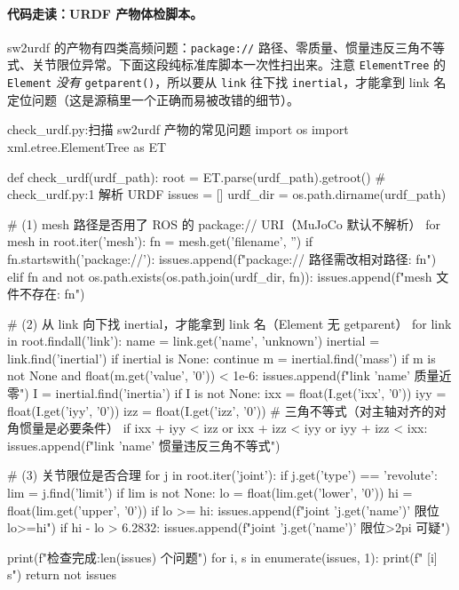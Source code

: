 \paragraph{代码走读：URDF 产物体检脚本。}sw2urdf 的产物有四类高频问题：\texttt{package://} 路径、零质量、惯量违反三角不等式、关节限位异常。下面这段纯标准库脚本一次性扫出来。注意 \texttt{ElementTree} 的 \texttt{Element} \emph{没有} \texttt{getparent()}，所以要从 \texttt{link} 往下找 \texttt{inertial}，才能拿到 link 名定位问题（这是源稿里一个正确而易被改错的细节）。

\begin{codebox}[Python]{check\_urdf.py:扫描 sw2urdf 产物的常见问题}
import os
import xml.etree.ElementTree as ET

def check_urdf(urdf_path):
    root = ET.parse(urdf_path).getroot()       # check_urdf.py:1 解析 URDF
    issues = []
    urdf_dir = os.path.dirname(urdf_path)

    # (1) mesh 路径是否用了 ROS 的 package:// URI（MuJoCo 默认不解析）
    for mesh in root.iter('mesh'):
        fn = mesh.get('filename', '')
        if fn.startswith('package://'):
            issues.append(f"package:// 路径需改相对路径: {fn}")
        elif fn and not os.path.exists(os.path.join(urdf_dir, fn)):
            issues.append(f"mesh 文件不存在: {fn}")

    # (2) 从 link 向下找 inertial，才能拿到 link 名（Element 无 getparent）
    for link in root.findall('link'):
        name = link.get('name', 'unknown')
        inertial = link.find('inertial')
        if inertial is None:
            continue
        m = inertial.find('mass')
        if m is not None and float(m.get('value', '0')) < 1e-6:
            issues.append(f"link '{name}' 质量近零")
        I = inertial.find('inertia')
        if I is not None:
            ixx = float(I.get('ixx', '0'))
            iyy = float(I.get('iyy', '0'))
            izz = float(I.get('izz', '0'))
            # 三角不等式（对主轴对齐的对角惯量是必要条件）
            if ixx + iyy < izz or ixx + izz < iyy or iyy + izz < ixx:
                issues.append(f"link '{name}' 惯量违反三角不等式")

    # (3) 关节限位是否合理
    for j in root.iter('joint'):
        if j.get('type') == 'revolute':
            lim = j.find('limit')
            if lim is not None:
                lo = float(lim.get('lower', '0'))
                hi = float(lim.get('upper', '0'))
                if lo >= hi:
                    issues.append(f"joint '{j.get('name')}' 限位 lo>=hi")
                if hi - lo > 6.2832:
                    issues.append(f"joint '{j.get('name')}' 限位>2pi 可疑")

    print(f"检查完成:{len(issues)} 个问题")
    for i, s in enumerate(issues, 1):
        print(f"  [{i}] {s}")
    return not issues
\end{codebox}

